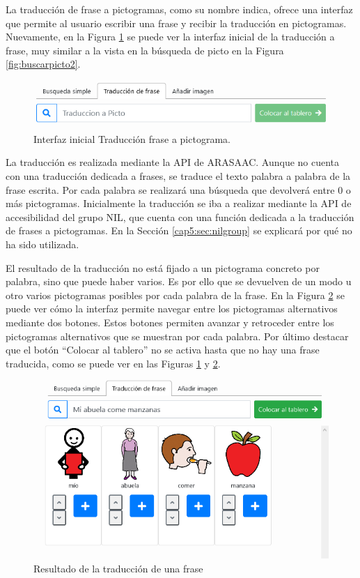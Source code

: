 La traducción de frase a pictogramas, como su nombre indica, ofrece una interfaz que permite al usuario escribir una frase y recibir la traducción en pictogramas. Nuevamente, en la Figura \ref{fig:traducirfraseinicial} se puede ver la interfaz inicial de la traducción a frase, muy similar a la vista en la búsqueda de picto en la Figura \ref{fig:buscarpicto2}. 

\begin{figure}[h!]
	\centering
	\includegraphics[width=0.7\linewidth]{Imagenes/Bitmap/traducirFraseInicial}
	\caption{Interfaz inicial Traducción frase a pictograma.}
	\label{fig:traducirfraseinicial}
\end{figure}

 
La traducción es realizada mediante la API de ARASAAC. Aunque no cuenta con una traducción dedicada a frases, se traduce el texto palabra a palabra de la frase escrita. Por cada palabra se realizará una búsqueda que devolverá entre 0 o más pictogramas. Inicialmente la traducción se iba a realizar mediante la API de accesibilidad del grupo NIL, que cuenta con una función dedicada a la traducción de frases a pictogramas. En la Sección \ref{cap5:sec:nilgroup} se explicará por qué no ha sido utilizada. 


El resultado de la traducción no está fijado a un pictograma concreto por palabra, sino que puede haber varios. Es por ello que se devuelven de un modo u otro varios pictogramas posibles por cada palabra de la frase.  En la Figura \ref{fig:traduccionpicto} se puede ver cómo la interfaz permite navegar entre los pictogramas alternativos mediante dos botones.
Estos botones permiten avanzar y retroceder entre los pictogramas alternativos que se muestran por cada palabra. Por último destacar que el botón “Colocar al tablero” no se activa hasta que no hay una frase traducida, como se puede ver en las Figuras \ref{fig:traducirfraseinicial} y \ref{fig:traduccionpicto}. 

\begin{figure}[h!]
	\centering
	\includegraphics[width=0.7\linewidth]{Imagenes/Bitmap/traduccionPicto}
	\caption{Resultado de la traducción de una frase}
	\label{fig:traduccionpicto}
\end{figure}

